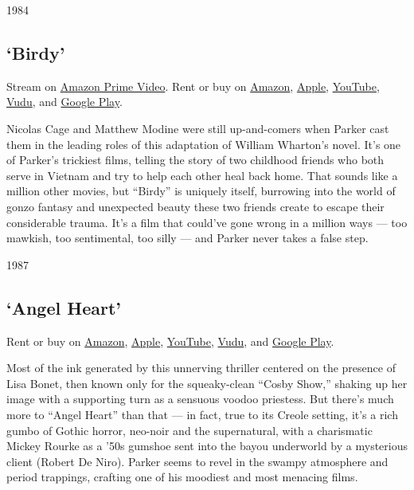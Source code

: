 1984

\hypertarget{birdy}{%
\subsection{`Birdy'}\label{birdy}}

Stream on
\href{https://www.amazon.com/gp/video/detail/B087QR1NGM/ref=atv_dl_rdr?tag=justwatch09-20}{Amazon
Prime Video}. Rent or buy on
\href{https://www.amazon.com/gp/video/detail/B003PV686Q/ref=atv_dp_share_cu_r}{Amazon},
\href{https://itunes.apple.com/us/movie/birdy-1984/id294722142?ign-mpt=uo\%3D4}{Apple},
\href{https://www.youtube.com/watch?v=vJsNYZP6LX4}{YouTube},
\href{https://www.vudu.com/content/movies/details/Birdy/15284}{Vudu},
and
\href{https://play.google.com/store/movies/details/Birdy?gl=US\&hl=en\&id=vJsNYZP6LX4}{Google
Play}.

Nicolas Cage and Matthew Modine were still up-and-comers when Parker
cast them in the leading roles of this adaptation of William Wharton's
novel. It's one of Parker's trickiest films, telling the story of two
childhood friends who both serve in Vietnam and try to help each other
heal back home. That sounds like a million other movies, but ``Birdy''
is uniquely itself, burrowing into the world of gonzo fantasy and
unexpected beauty these two friends create to escape their considerable
trauma. It's a film that could've gone wrong in a million ways --- too
mawkish, too sentimental, too silly --- and Parker never takes a false
step.

1987

\hypertarget{angel-heart}{%
\subsection{`Angel Heart'}\label{angel-heart}}

Rent or buy on
\href{https://www.amazon.com/gp/video/detail/B001YOYVK6/ref=atv_dp_share_cu_r}{Amazon},
\href{https://itunes.apple.com/us/movie/angel-heart/id305499575?ign-mpt=uo\%3D4}{Apple},
\href{https://www.youtube.com/watch?v=tMIEC_cPB30}{YouTube},
\href{https://www.vudu.com/content/movies/details/Angel-Heart/7476}{Vudu},
and
\href{https://play.google.com/store/movies/details/Angel_Heart?gl=US\&hl=en\&id=tMIEC_cPB30\&PAffiliateID=110l4uj}{Google
Play}.

Most of the ink generated by this unnerving thriller centered on the
presence of Lisa Bonet, then known only for the squeaky-clean ``Cosby
Show,'' shaking up her image with a supporting turn as a sensuous voodoo
priestess. But there's much more to ``Angel Heart'' than that --- in
fact, true to its Creole setting, it's a rich gumbo of Gothic horror,
neo-noir and the supernatural, with a charismatic Mickey Rourke as a
'50s gumshoe sent into the bayou underworld by a mysterious client
(Robert De Niro). Parker seems to revel in the swampy atmosphere and
period trappings, crafting one of his moodiest and most menacing films.

